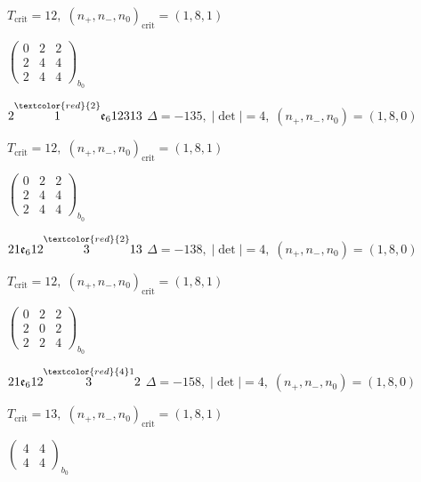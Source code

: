 \documentclass[10pt]{article}
\begin{document}
\hspace{1em}$T_{\text{crit}}=12,\; (n_+,n_-,n_0)_{\text{crit}}=(1,8,1)$

\hspace{2em}$\left(\begin{smallmatrix}0 & 2 & 2 \\ 2 & 4 & 4 \\ 2 & 4 & 4\end{smallmatrix}\right)_{\!b_0}$

\smallskip

$2\overset{\textcolor{red}{2}}{1}\mathfrak{e}_612313$ \quad $\Delta=-135,\; |\det|=4,\; (n_+,n_-,n_0)=(1,8,0)$

\hspace{1em}$T_{\text{crit}}=12,\; (n_+,n_-,n_0)_{\text{crit}}=(1,8,1)$

\hspace{2em}$\left(\begin{smallmatrix}0 & 2 & 2 \\ 2 & 4 & 4 \\ 2 & 4 & 4\end{smallmatrix}\right)_{\!b_0}$

$21\mathfrak{e}_612\overset{\textcolor{red}{2}}{3}13$ \quad $\Delta=-138,\; |\det|=4,\; (n_+,n_-,n_0)=(1,8,0)$

\hspace{1em}$T_{\text{crit}}=12,\; (n_+,n_-,n_0)_{\text{crit}}=(1,8,1)$

\hspace{2em}$\left(\begin{smallmatrix}0 & 2 & 2 \\ 2 & 0 & 2 \\ 2 & 2 & 4\end{smallmatrix}\right)_{\!b_0}$

\smallskip

$21\mathfrak{e}_612\overset{\textcolor{red}{4}1}{3}2$ \quad $\Delta=-158,\; |\det|=4,\; (n_+,n_-,n_0)=(1,8,0)$

\hspace{1em}$T_{\text{crit}}=13,\; (n_+,n_-,n_0)_{\text{crit}}=(1,8,1)$

\hspace{2em}$\left(\begin{smallmatrix}4 & 4 \\ 4 & 4\end{smallmatrix}\right)_{\!b_0}$
\end{document}

